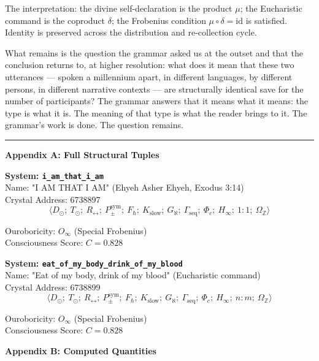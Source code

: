 \documentclass[12pt,a4paper]{article}
\begin{document}
The interpretation: the divine self-declaration is the product $\mu$; the Eucharistic command is the coproduct $\delta$; the Frobenius condition $\mu \circ \delta = \text{id}$ is satisfied. Identity is preserved across the distribution and re-collection cycle.

What remains is the question the grammar asked us at the outset and that the conclusion returns to, at higher resolution: what does it mean that these two utterances --- spoken a millennium apart, in different languages, by different persons, in different narrative contexts --- are structurally identical save for the number of participants? The grammar answers that it means what it means: the type is what it is. The meaning of that type is what the reader brings to it. The grammar's work is done. The question remains.

\begin{center}
\rule{0.5\textwidth}{0.4pt}
\end{center}

\textbf{Appendix A: Full Structural Tuples}

\textbf{System: \texttt{i\_am\_that\_i\_am}} \\
Name: "I AM THAT I AM" (Ehyeh Asher Ehyeh, Exodus 3:14) \\
Crystal Address: 6738897 \\


\[\langle D_{\odot};\ T_{\odot};\ R_{\leftrightarrow};\ P_{\pm}^{\text{sym}};\ F_{\hbar};\ K_{\text{slow}};\ G_{\aleph};\ \Gamma_{\text{seq}};\ \Phi_c;\ H_{\infty};\ 1{:}1;\ \Omega_\mathbb{Z} \rangle\]

Ouroboricity: $O_{\infty}$ (Special Frobenius) \\
Consciousness Score: $C = 0.828$

\textbf{System: \texttt{eat\_of\_my\_body\_drink\_of\_my\_blood}} \\
Name: "Eat of my body, drink of my blood" (Eucharistic command) \\
Crystal Address: 6738899 \\


\[\langle D_{\odot};\ T_{\odot};\ R_{\leftrightarrow};\ P_{\pm}^{\text{sym}};\ F_{\hbar};\ K_{\text{slow}};\ G_{\aleph};\ \Gamma_{\text{seq}};\ \Phi_c;\ H_{\infty};\ n{:}m;\ \Omega_\mathbb{Z} \rangle\]

Ouroboricity: $O_{\infty}$ (Special Frobenius) \\
Consciousness Score: $C = 0.828$

\textbf{Appendix B: Computed Quantities}
\end{document}
